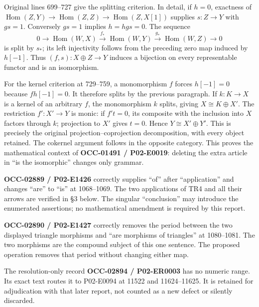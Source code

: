 Original lines 699–\allowbreak{}727 give the splitting criterion. In detail,\allowbreak{} if \(h=0\),\allowbreak{} exactness of \(\operatorname{Hom}(Z,Y)\to\operatorname{Hom}(Z,Z)
\to\operatorname{Hom}(Z,X[1])\) supplies \(s:Z\to Y\) with \(gs=1\). Conversely \(gs=1\) implies \(h=hgs=0\). The sequence \[
0\longrightarrow\operatorname{Hom}(W,X)
\xrightarrow{f_*}\operatorname{Hom}(W,Y)
\xrightarrow{g_*}\operatorname{Hom}(W,Z)\longrightarrow0
\] is split by \(s_*\); its left injectivity follows from the preceding zero map induced by \(h[-1]\). Thus \((f,s):X\oplus Z\to Y\) induces a bijection on every representable functor and is an isomorphism.

For the kernel criterion at 729–\allowbreak{}759,\allowbreak{} a monomorphism \(f\) forces \(h[-1]=0\) because \(fh[-1]=0\). It therefore splits by the previous paragraph. If \(k:K\to X\) is a kernel of an arbitrary \(f\),\allowbreak{} the monomorphism \(k\) splits,\allowbreak{} giving \(X\cong K\oplus X'\). The restriction \(f':X'\to Y\) is monic:\allowbreak{} if \(f't=0\),\allowbreak{} its composite with the inclusion into \(X\) factors through \(k\); projection to \(X'\) gives \(t=0\). Hence \(Y\cong X'\oplus Y'\). This is precisely the original projection–\allowbreak{}coprojection decomposition,\allowbreak{} with every object retained. The cokernel argument follows in the opposite category. This proves the mathematical context of \textbf{OCC-01491 /\allowbreak{} P02-E0019}:\allowbreak{} deleting the extra article in ``is the isomorphic'' changes only grammar.

\textbf{OCC-02889 /\allowbreak{} P02-E1426} correctly supplies ``of'' after ``application'' and changes ``are'' to ``is'' at 1068–\allowbreak{}1069. The two applications of TR4 and all their arrows are verified in §3 below. The singular ``conclusion'' may introduce the enumerated assertions; no mathematical amendment is required by this report.

\textbf{OCC-02890 /\allowbreak{} P02-E1427} correctly removes the period between the two displayed triangle morphisms and ``are morphisms of triangles'' at 1080–\allowbreak{}1081. The two morphisms are the compound subject of this one sentence. The proposed operation removes that period without changing either map.

The resolution-only record \textbf{OCC-02894 /\allowbreak{} P02-ER0003} has no numeric range. Its exact text routes it to P02-E0094 at 11522 and 11624–\allowbreak{}11625. It is retained for adjudication with that later report,\allowbreak{} not counted as a new defect or silently discarded.

